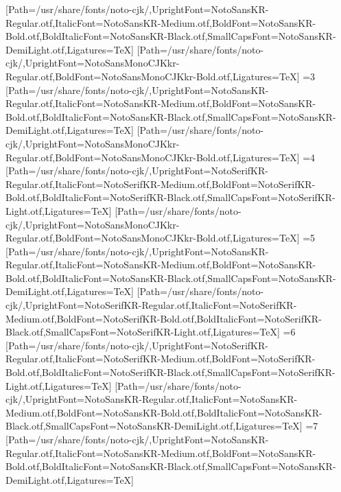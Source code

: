 [Path=/usr/share/fonts/noto-cjk/,UprightFont=NotoSansKR-Regular.otf,ItalicFont=NotoSansKR-Medium.otf,BoldFont=NotoSansKR-Bold.otf,BoldItalicFont=NotoSansKR-Black.otf,SmallCapsFont=NotoSansKR-DemiLight.otf,Ligatures=TeX]
[Path=/usr/share/fonts/noto-cjk/,UprightFont=NotoSansMonoCJKkr-Regular.otf,BoldFont=NotoSansMonoCJKkr-Bold.otf,Ligatures=TeX]
\else\ifnum\value{CJKFonts}=3
[Path=/usr/share/fonts/noto-cjk/,UprightFont=NotoSansKR-Regular.otf,ItalicFont=NotoSansKR-Medium.otf,BoldFont=NotoSansKR-Bold.otf,BoldItalicFont=NotoSansKR-Black.otf,SmallCapsFont=NotoSansKR-DemiLight.otf,Ligatures=TeX]
[Path=/usr/share/fonts/noto-cjk/,UprightFont=NotoSansMonoCJKkr-Regular.otf,BoldFont=NotoSansMonoCJKkr-Bold.otf,Ligatures=TeX]
\else\ifnum\value{CJKFonts}=4
[Path=/usr/share/fonts/noto-cjk/,UprightFont=NotoSerifKR-Regular.otf,ItalicFont=NotoSerifKR-Medium.otf,BoldFont=NotoSerifKR-Bold.otf,BoldItalicFont=NotoSerifKR-Black.otf,SmallCapsFont=NotoSerifKR-Light.otf,Ligatures=TeX]
[Path=/usr/share/fonts/noto-cjk/,UprightFont=NotoSansMonoCJKkr-Regular.otf,BoldFont=NotoSansMonoCJKkr-Bold.otf,Ligatures=TeX]
\else\ifnum\value{CJKFonts}=5
[Path=/usr/share/fonts/noto-cjk/,UprightFont=NotoSansKR-Regular.otf,ItalicFont=NotoSansKR-Medium.otf,BoldFont=NotoSansKR-Bold.otf,BoldItalicFont=NotoSansKR-Black.otf,SmallCapsFont=NotoSansKR-DemiLight.otf,Ligatures=TeX]
[Path=/usr/share/fonts/noto-cjk/,UprightFont=NotoSerifKR-Regular.otf,ItalicFont=NotoSerifKR-Medium.otf,BoldFont=NotoSerifKR-Bold.otf,BoldItalicFont=NotoSerifKR-Black.otf,SmallCapsFont=NotoSerifKR-Light.otf,Ligatures=TeX]
\else\ifnum\value{CJKFonts}=6
[Path=/usr/share/fonts/noto-cjk/,UprightFont=NotoSerifKR-Regular.otf,ItalicFont=NotoSerifKR-Medium.otf,BoldFont=NotoSerifKR-Bold.otf,BoldItalicFont=NotoSerifKR-Black.otf,SmallCapsFont=NotoSerifKR-Light.otf,Ligatures=TeX]
[Path=/usr/share/fonts/noto-cjk/,UprightFont=NotoSansKR-Regular.otf,ItalicFont=NotoSansKR-Medium.otf,BoldFont=NotoSansKR-Bold.otf,BoldItalicFont=NotoSansKR-Black.otf,SmallCapsFont=NotoSansKR-DemiLight.otf,Ligatures=TeX]
\else\ifnum\value{CJKFonts}=7
[Path=/usr/share/fonts/noto-cjk/,UprightFont=NotoSansKR-Regular.otf,ItalicFont=NotoSansKR-Medium.otf,BoldFont=NotoSansKR-Bold.otf,BoldItalicFont=NotoSansKR-Black.otf,SmallCapsFont=NotoSansKR-DemiLight.otf,Ligatures=TeX]
